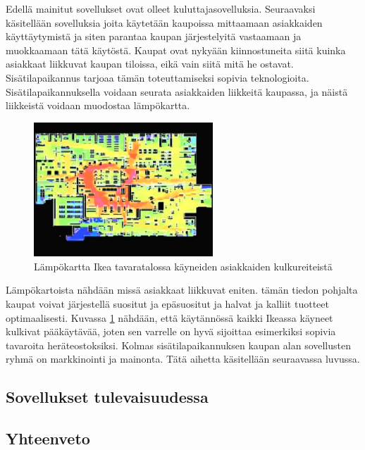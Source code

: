 Edellä mainitut sovellukset ovat olleet kuluttajasovelluksia. Seuraavaksi käsitellään sovelluksia joita käytetään kaupoissa mittaamaan asiakkaiden käyttäytymistä ja siten parantaa kaupan järjestelyitä vastaamaan ja muokkaamaan tätä käytöstä. Kaupat ovat nykyään kiinnostuneita siitä kuinka asiakkaat liikkuvat kaupan tiloissa, eikä vain siitä mitä he ostavat\cite{heat}. Sisätilapaikannus tarjoaa tämän toteuttamiseksi sopivia teknologioita. Sisätilapaikannuksella voidaan seurata asiakkaiden liikkeitä kaupassa, ja näistä liikkeistä voidaan muodostaa lämpökartta.
\begin{figure}[htpb]
    \centering
    \includegraphics[width=0.6\textwidth]{ikeaheatmap.png}
    \caption{Lämpökartta Ikea tavaratalossa käyneiden asiakkaiden kulkureiteistä\cite{ikea}}
    \label{ikea}
\end{figure}
Lämpökartoista nähdään missä asiakkaat liikkuvat eniten. tämän tiedon pohjalta kaupat voivat järjestellä suositut ja epäsuositut ja halvat ja kalliit tuotteet optimaalisesti\cite{heat}.
Kuvassa \ref{ikea} nähdään, että käytännössä kaikki Ikeassa käyneet kulkivat pääkäytävää, joten sen varrelle on hyvä sijoittaa esimerkiksi sopivia tavaroita heräteostoksiksi.
Kolmas sisätilapaikannuksen kaupan alan sovellusten ryhmä on markkinointi ja mainonta. Tätä aihetta käsitellään seuraavassa luvussa.

\subsection{Sovellukset tulevaisuudessa}
\subsection{Yhteenveto}


